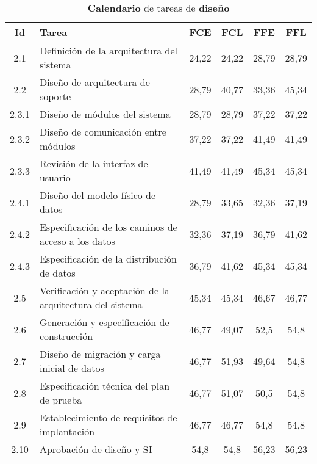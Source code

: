 \documentclass[11pt,a4paper,spanish,twoside]{report}
\begin{document}
\begin{table}[!h]
  \centering
  \begin{tabular}{|c||p{5.3cm}||c|c|c|c|}
    \hline
    \textbf{Id} & \textbf{Tarea} & \textbf{FCE} & \textbf{FCL} &
    \textbf{FFE} & \textbf{FFL}\\
    \hline
    2.1 & Definición de la arquitectura del sistema & 24,22 & 24,22 & 28,79
    & 28,79 \\ 
    \hline
    2.2 & Diseño de arquitectura de soporte & 28,79 & 40,77 & 33,36 & 45,34 \\
    \hline
    2.3.1 & Diseño de módulos del sistema  & 28,79 & 28,79 & 37,22 & 37,22 \\
    \hline
    2.3.2 & Diseño de comunicación entre módulos & 37,22 & 37,22 & 41,49  &
    41,49  \\ 
    \hline
    2.3.3 & Revisión de la interfaz de usuario  & 41,49 & 41,49 & 45,34 &
    45,34 \\ 
    \hline
    2.4.1 & Diseño del modelo físico de datos  & 28,79 & 33,65 & 32,36 &
    37,19 \\ 
    \hline
    2.4.2 & Especificación de los caminos de acceso a los datos & 32,36
    &37,19  & 36,79  & 41,62 \\ 
    \hline
    2.4.3 & Especificación de la distribución de datos  & 36,79 & 41,62
    &45,34  & 45,34 \\ 
    \hline
    2.5 & Verificación y aceptación de la arquitectura del sistema & 45,34
    & 45,34 & 46,67 & 46,77 \\ 
    \hline
    2.6 & Generación y especificación de construcción & 46,77 & 49,07 &
    52,5 & 54,8 \\ 
    \hline
    2.7 & Diseño de migración y carga inicial de datos & 46,77 & 51,93 &
    49,64 & 54,8 \\ 
    \hline
    2.8 & Especificación técnica del plan de prueba & 46,77 & 51,07 & 50,5
    & 54,8 \\ 
    \hline
    2.9 & Establecimiento de requisitos de implantación & 46,77 & 46,77
    &54,8 & 54,8 \\ 
    \hline
    2.10 & Aprobación de diseño y SI & 54,8 & 54,8 & 56,23 & 56,23\\
    \hline
  \end{tabular}
  \caption{\textbf{Calendario} de tareas de \textbf{diseño}}
  \label{Tab:CALdis}
\end{table}
    
\end{document}

